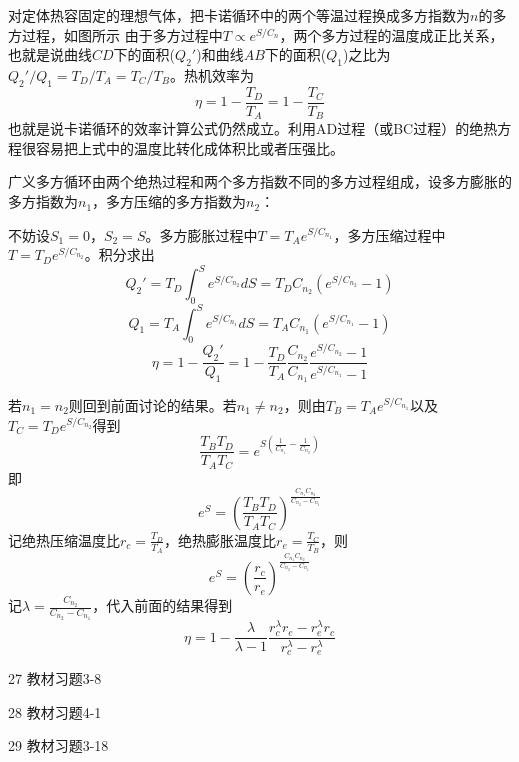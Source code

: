 \documentclass[CJK]{beamer}
\begin{document}
\begin{frame}
\bch
{}
对定体热容固定的理想气体，把卡诺循环中的两个等温过程换成多方指数为$n$的多方过程，如图所示
\emini
{}
\emini
{\small
由于多方过程中$T\propto e^{S/C_n}$，两个多方过程的温度成正比关系，也就是说曲线$CD$下的面积($Q_2'$)和曲线$AB$下的面积($Q_1$)之比为$Q_2'/Q_1=T_D/T_A = T_C/T_B$。热机效率为
$$ \eta = 1 - \frac{T_D}{T_A} = 1 - \frac{T_C}{T_B}$$
也就是说卡诺循环的效率计算公式仍然成立。利用AD过程（或BC过程）的绝热方程很容易把上式中的温度比转化成体积比或者压强比。
}
\ech
\end{frame}

\begin{frame}
\bch
{}
广义多方循环由两个绝热过程和两个多方指数不同的多方过程组成，设多方膨胀的多方指数为$n_1$，多方压缩的多方指数为$n_2$：
\emini
{}
\emini

{\scriptsize 
不妨设$S_1=0$，$S_2=S$。多方膨胀过程中$T = T_A e^{S/C_{n_1}}$，多方压缩过程中$T= T_D e^{S/C_{n_2}}$。积分求出
$$Q_2' = T_D \int_0^S e^{S/C_{n_2}} dS = T_DC_{n_2}\left(e^{S/C_{n_2}}-1\right)$$
$$Q_1  = T_A \int_0^S e^{S/C_{n_1}} dS = T_AC_{n_1}\left(e^{S/C_{n_1}}-1\right)$$
$$\eta = 1-\frac{Q_2'}{Q_1} = 1 - \frac{T_D}{T_A} \frac{C_{n_2}}{C_{n_1}} \frac{e^{S/C_{n_2}}-1}{e^{S/C_{n_1}}-1}$$
}
\ech
\end{frame}

\begin{frame}
\bch
{\scriptsize 
若$n_1=n_2$则回到前面讨论的结果。若$n_1\ne n_2$，则由$T_B = T_A e^{S/C_{n_1}}$以及$T_C = T_D e^{S/C_{n_2}}$得到
$$\frac{T_B T_D}{T_AT_C} = e^{S\left(\frac{1}{C_{n_1}} - \frac{1}{C_{n_2}}\right)}$$
即
$$ e^S = \left(\frac{T_B T_D}{T_AT_C}\right)^{\frac{C_{n_1}C_{n_2}}{C_{n_2}-C_{n_1}}}$$
记绝热压缩温度比$r_c = \frac{T_D}{T_A}$，绝热膨胀温度比$r_e = \frac{T_C}{T_B}$，则
$$ e^S = \left(\frac{r_c}{r_e}\right)^{\frac{C_{n_1}C_{n_2}}{C_{n_2}-C_{n_1}}}$$
记{\blue $\lambda = \frac{C_{n_2}}{C_{n_2}-C_{n_1}}$}，代入前面的结果得到
{\blue $$\eta =1- \frac{\lambda}{\lambda-1} \frac{r_c^\lambda r_e - r_e^\lambda r_c}{r_c^\lambda - r_e^\lambda}$$}
}
\ech
\end{frame}


\begin{frame}
\bch
\bitem
\item[27]{教材习题3-8}
\item[28]{教材习题4-1}
\item[29]{教材习题3-18}
\eitem

\ech
\end{frame}
\end{document}
